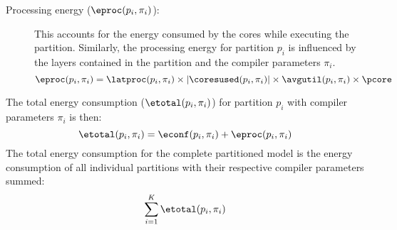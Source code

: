 \begin{description}
    \item[Processing energy ($\eproc(p_i, \pi_i)$):]
    This accounts for the energy consumed by the cores while executing the partition.
    Similarly, the processing energy for partition $p_i$ is influenced by the layers contained in the partition and the compiler parameters $\pi_i$.
    \begin{equation}
        \eproc(p_i, \pi_i) = \latproc(p_i, \pi_i) \times \lvert \coresused(p_i, \pi_i) \rvert \times \avgutil(p_i, \pi_i) \times \pcore
    \end{equation}
    \eqexplSetItemWidth{6em}
\end{description}
The total energy consumption ($\etotal(p_i, \pi_i)$) for partition $p_i$ with compiler parameters $\pi_i$ is then:
\begin{equation}
    \etotal(p_i, \pi_i) = \econf(p_i, \pi_i) + \eproc(p_i, \pi_i)
\end{equation}
The total energy consumption for the complete partitioned model is the energy consumption of all individual partitions with their respective compiler parameters summed:
\begin{equation}
    \sum_{i=1}^{K} \etotal(p_i, \pi_i)
\end{equation}
